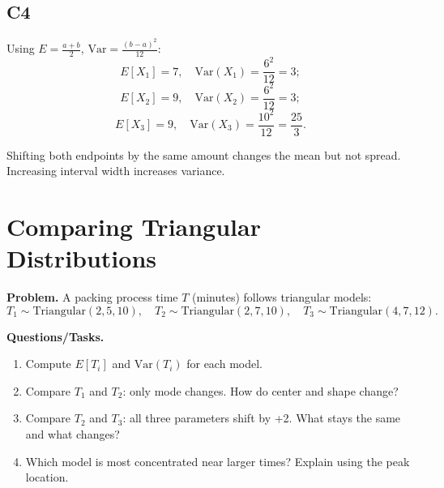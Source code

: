 \subsection*{C4}
Using \(E=\frac{a+b}{2}\), \(\mathrm{Var}=\frac{(b-a)^2}{12}\):
\[
E[X_1]=7,\quad \mathrm{Var}(X_1)=\frac{6^2}{12}=3;
\]
\[
E[X_2]=9,\quad \mathrm{Var}(X_2)=\frac{6^2}{12}=3;
\]
\[
E[X_3]=9,\quad \mathrm{Var}(X_3)=\frac{10^2}{12}=\frac{25}{3}.
\]
\begin{center}
\end{center}
Shifting both endpoints by the same amount changes the mean but not spread. Increasing interval width increases variance.

\section{Comparing Triangular Distributions}

\textbf{Problem.}
A packing process time \(T\) (minutes) follows triangular models:
\[
T_1\sim \text{Triangular}(2,5,10),\quad
T_2\sim \text{Triangular}(2,7,10),\quad
T_3\sim \text{Triangular}(4,7,12).
\]

\textbf{Questions/Tasks.}
\begin{enumerate}[label=\textbf{\alph*)}]
  \item Compute \(E[T_i]\) and \(\mathrm{Var}(T_i)\) for each model.
  \item Compare \(T_1\) and \(T_2\): only mode changes. How do center and shape change?
  \item Compare \(T_2\) and \(T_3\): all three parameters shift by +2. What stays the same and what changes?
  \item Which model is most concentrated near larger times? Explain using the peak location.
\end{enumerate}

